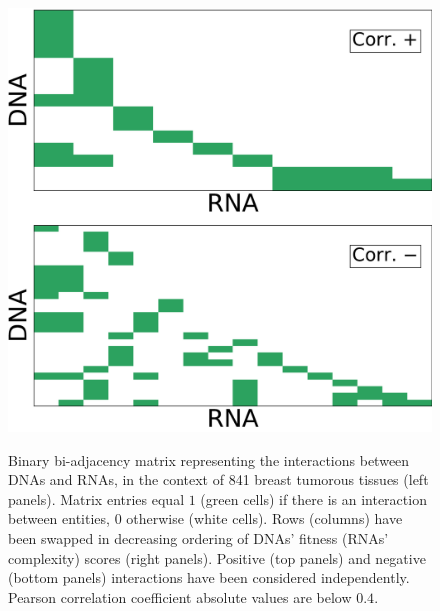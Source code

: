 \documentclass[10pt,a4paper]{article}
\begin{document}
\begin{figure}
{\includegraphics[width=\columnwidth]{FIG/ADN-ARN_FQ-Matrix-average-unit-0.4.pdf}
}
\caption{\label{fig:matrix}Binary bi-adjacency matrix representing the interactions between DNAs and RNAs, in the context of 841 breast tumorous tissues (left panels). Matrix entries equal $1$ (green cells) if there is an interaction between entities, $0$ otherwise (white cells). Rows (columns) have been swapped in decreasing ordering of DNAs' fitness (RNAs' complexity) scores (right panels). Positive (top panels) and negative (bottom panels) interactions have been considered independently. Pearson correlation coefficient absolute values are below $0.4$.}
\end{figure}
\printbibliography
\end{document}
